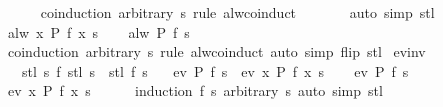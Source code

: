 \begin{isabellebody}
\ \ \ \ \isamarkupfalse%
\ {\isacharparenleft}coinduction\ arbitrary{\isacharcolon}\ s\ rule{\isacharcolon}\ alw{\isacharunderscore}coinduct{\isacharparenright}\isanewline
\ \ \ \ \ \ \ {\isacharparenleft}auto\ simp{\isacharcolon}\ stl{\isacharparenright}\isanewline
{}\isamarkupfalse%
\isanewline
\ \ \isamarkupfalse%
\ {\isachardoublequoteopen}alw\ {\isacharparenleft}{\isasymlambda}x{\isachardot}\ P\ {\isacharparenleft}f\ x{\isacharparenright}{\isacharparenright}\ s{\isachardoublequoteclose}\ \isamarkupfalse%
\ \isamarkupfalse%
\ {\isachardoublequoteopen}alw\ P\ {\isacharparenleft}f\ s{\isacharparenright}{\isachardoublequoteclose}\isanewline
\ \ \ \ \isamarkupfalse%
\ {\isacharparenleft}coinduction\ arbitrary{\isacharcolon}\ s\ rule{\isacharcolon}\ alw{\isacharunderscore}coinduct{\isacharparenright}\ {\isacharparenleft}auto\ simp\ flip{\isacharcolon}\ stl{\isacharparenright}\isanewline
{}\isamarkupfalse%
%
\endisatagproof
{\isafoldproof}%
%
\isadelimproof
\isanewline
%
\endisadelimproof
\isanewline
{}\isamarkupfalse%
\ ev{\isacharunderscore}inv{\isacharcolon}\isanewline
\ \ \ stl{\isacharcolon}\ {\isachardoublequoteopen}{\isasymAnd}s{\isachardot}\ f\ {\isacharparenleft}stl\ s{\isacharparenright}\ {\isacharequal}\ stl\ {\isacharparenleft}f\ s{\isacharparenright}{\isachardoublequoteclose}\isanewline
\ \ \ {\isachardoublequoteopen}ev\ P\ {\isacharparenleft}f\ s{\isacharparenright}\ {\isasymlongleftrightarrow}\ ev\ {\isacharparenleft}{\isasymlambda}x{\isachardot}\ P\ {\isacharparenleft}f\ x{\isacharparenright}{\isacharparenright}\ s{\isachardoublequoteclose}\isanewline
%
\isadelimproof
%
\endisadelimproof
%
\isatagproof
{}\isamarkupfalse%
\isanewline
\ \ \isamarkupfalse%
\ {\isachardoublequoteopen}ev\ P\ {\isacharparenleft}f\ s{\isacharparenright}{\isachardoublequoteclose}\ \isamarkupfalse%
\ \isamarkupfalse%
\ {\isachardoublequoteopen}ev\ {\isacharparenleft}{\isasymlambda}x{\isachardot}\ P\ {\isacharparenleft}f\ x{\isacharparenright}{\isacharparenright}\ s{\isachardoublequoteclose}\isanewline
\ \ \ \ \isamarkupfalse%
\ {\isacharparenleft}induction\ {\isachardoublequoteopen}f\ s{\isachardoublequoteclose}\ arbitrary{\isacharcolon}\ s{\isacharparenright}\ {\isacharparenleft}auto\ simp{\isacharcolon}\ stl{\isacharparenright}\isanewline
{}\isamarkupfalse%
\isanewline
\ \ \isamarkupfalse%

\end{isabellebody}
